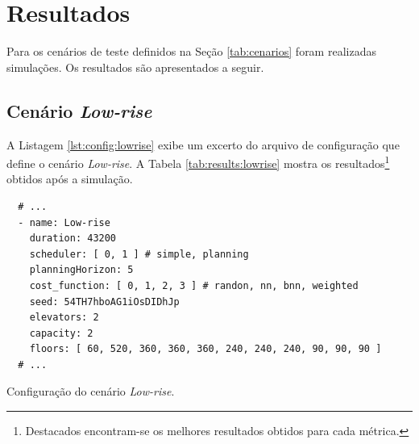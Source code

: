 \chapter{\label{chap:results}Resultados}

Para os cenários de teste definidos na Seção \ref{tab:cenarios} foram realizadas
simulações. Os resultados são apresentados a seguir.

\section{Cenário \textit{Low-rise}}

A Listagem \ref{lst:config:lowrise} exibe um excerto do arquivo de configuração
que define o cenário \textit{Low-rise}. A Tabela \ref{tab:results:lowrise}
mostra os resultados\footnote{Destacados encontram-se os melhores resultados
obtidos para cada métrica.} obtidos após a simulação.

\begin{listing}[htb]
  \centering
    \begin{verbatim}
  # ...
  - name: Low-rise
    duration: 43200
    scheduler: [ 0, 1 ] # simple, planning
    planningHorizon: 5
    cost_function: [ 0, 1, 2, 3 ] # randon, nn, bnn, weighted
    seed: 54TH7hboAG1iOsDIDhJp
    elevators: 2
    capacity: 2
    floors: [ 60, 520, 360, 360, 360, 240, 240, 240, 90, 90, 90 ]
  # ...
    \end{verbatim}
  \caption{Configuração do cenário \textit{Low-rise}.}
  \label{lst:config:lowrise}
\end{listing}

